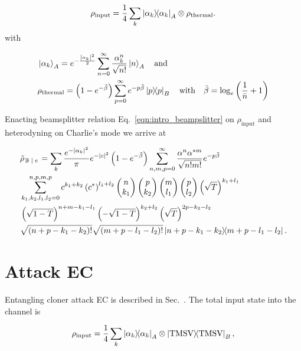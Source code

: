 \begin{equation}\label{eqn:qds_bs1_input_state}
\rho_{\text{input}} = \frac{1}{4}\sum_k \dyad{\alpha_k}_A \otimes \rho_{\text{thermal}}.
\end{equation}
with 

\begin{align}
&\ket{\alpha_k}_A = e^{- \frac{\left| \alpha_k \right|^2}{2}} \sum_{n=0}^\infty \frac{\alpha_k^n}{\sqrt{n!}} \ket{n}_A \qq{and}\notag \\
&\rho_{\text{thermal}} = \left(1 - e^{-\tilde{\beta}}\right) \sum_{p=0}^\infty e^{- p \tilde{\beta}}\dyad{p}_B \qq{with} \tilde{\beta} = \log_e\left(\frac{1}{\bar{n}} +1\right)
\end{align}



\noindent Enacting beamsplitter relation Eq.~\ref{eqn:intro_beampslitter} on $\rho_{\text{input}}$ and heterodyning on Charlie's mode we arrive at 

\begin{align}
%
&\tilde{\rho}_{\left. \mathbb{B} \given c\right.} = \sum_k \frac{e^{- \left|\alpha_k\right|^2}}{\pi} e^{-\left|c\right|^2} \left( 1 - e^{- \tilde{\beta}}\right) \sum_{n, m, p = 0}^\infty \frac{\alpha^n \alpha^{* m}}{\sqrt{n! m!}} e^{- p \tilde{\beta}}  \notag \\
%
&\sum_{k_1, k_2, l_1, l_2=0}^{n, p, m, p} c^{k_1 + k_2} \left(c^*\right)^{l_1 + l_2} \pmqty{n \\ k_1} \pmqty{ p \\ k_2} \pmqty{ m \\ l_1 } \pmqty{p \\ l_2} \left( \sqrt{T} \right)^{k_1 + l_1} \notag \\
%
&\left(\sqrt{1-T}\right)^{n + m - k_1 - l_1} \left( - \sqrt{1-T}\right)^{k_2 + l_2} \left( \sqrt{T} \right)^{2 p - k_2 - l_2} \notag \\
%
&\sqrt{\left(n + p - k_1 - k_2\right)!}\sqrt{\left(m + p - l_1 - l_2 \right)!} \dyad{n + p - k_1 - k_2}{m + p - l_1 - l_2}.
%
\end{align}

\section{Attack EC}
Entangling cloner attack EC is described in Sec.~. The total input state into the channel is

\begin{equation}
\rho_{\text{input}} = \frac{1}{4}\sum_k \dyad{\alpha_k}_A \otimes \dyad{\text{TMSV}}_B,
\end{equation}

